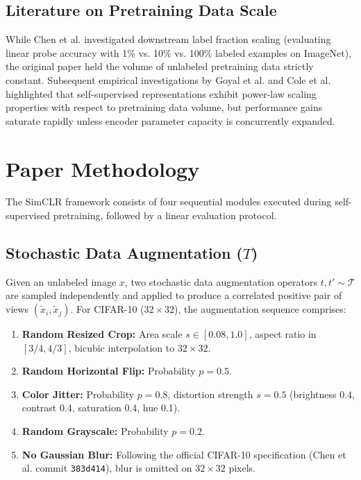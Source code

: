\documentclass[conference]{IEEEtran}
\begin{document}
\subsection{Literature on Pretraining Data Scale}
While Chen et al. \cite{chen2020simple} investigated downstream label fraction scaling (evaluating linear probe accuracy with 1\% vs. 10\% vs. 100\% labeled examples on ImageNet), the original paper held the volume of unlabeled pretraining data strictly constant. Subsequent empirical investigations by Goyal et al. \cite{goyal2019scaling} and Cole et al. \cite{cole2022does} highlighted that self-supervised representations exhibit power-law scaling properties with respect to pretraining data volume, but performance gains saturate rapidly unless encoder parameter capacity is concurrently expanded.

\section{Paper Methodology}
The SimCLR framework consists of four sequential modules executed during self-supervised pretraining, followed by a linear evaluation protocol.

\subsection{Stochastic Data Augmentation ($T$)}
Given an unlabeled image $x$, two stochastic data augmentation operators $t, t' \sim \mathcal{T}$ are sampled independently and applied to produce a correlated positive pair of views $(\tilde{x}_i, \tilde{x}_j)$. For CIFAR-10 ($32 \times 32$), the augmentation sequence comprises:
\begin{enumerate}
    \item \textbf{Random Resized Crop:} Area scale $s \in [0.08, 1.0]$, aspect ratio in $[3/4, 4/3]$, bicubic interpolation to $32 \times 32$.
    \item \textbf{Random Horizontal Flip:} Probability $p = 0.5$.
    \item \textbf{Color Jitter:} Probability $p = 0.8$, distortion strength $s=0.5$ (brightness 0.4, contrast 0.4, saturation 0.4, hue 0.1).
    \item \textbf{Random Grayscale:} Probability $p = 0.2$.
    \item \textbf{No Gaussian Blur:} Following the official CIFAR-10 specification (Chen et al. commit \texttt{383d414}), blur is omitted on $32 \times 32$ pixels.
\end{enumerate}
\end{document}
